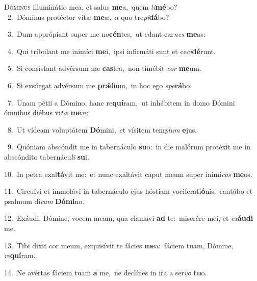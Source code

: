 \lettrine{\initial\textcolor{\initialcolor}{D}}{óminus} illuminátio mea, et salus \textbf{me}\-a,~\star quem \textit{ti}\-\textbf{mé}bo?\\
{\numbfont\textcolor{\numbcolor}{~2.}}~Dóminus protéctor vitæ \textbf{me}\-æ,~\star a quo tre\-\textit{pi}\-\textbf{dá}bo?\par
{\numbfont\textcolor{\numbcolor}{~3.}}~Dum apprópiant super me no\-\textbf{cén}\-tes,~\star ut edant car\textit{nes} \textbf{me}\-as:\par
{\numbfont\textcolor{\numbcolor}{~4.}}~Qui tríbulant me inimíci \textbf{me}\-i,~\star ipsi infirmáti sunt et ce\-\textit{ci}\-\textbf{dé}runt.\par
{\numbfont\textcolor{\numbcolor}{~5.}}~Si consístant advérsum me \textbf{cas}\-tra,~\star non timébit \textit{cor} \textbf{me}\-um.\par
{\numbfont\textcolor{\numbcolor}{~6.}}~Si exsúrgat advérsum me \textbf{prǽ}\-lium,~\star in hoc ego \textit{spe}\-\textbf{rá}bo.\par
{\numbfont\textcolor{\numbcolor}{~7.}}~Unam pétii a Dómino, hanc re\-\textbf{quí}\-ram,~\star ut inhábitem in domo Dómini ómnibus diébus vi\textit{tæ} \textbf{me}\-æ:\par
{\numbfont\textcolor{\numbcolor}{~8.}}~Ut vídeam voluptátem \textbf{Dó}\-mini,~\star et vísitem tem\textit{plum} \textbf{e}\-jus.\par
{\numbfont\textcolor{\numbcolor}{~9.}}~Quóniam abscóndit me in tabernáculo \textbf{su}\-o:~\star in die malórum protéxit me in abscóndito tabernácu\textit{li} \textbf{su}\-i.\par
{\numbfont\textcolor{\numbcolor}{10.}}~In petra exal\-\textbf{tá}\-vit me:~\star et nunc exaltávit caput meum super inimí\textit{cos} \textbf{me}\-os.\par
{\numbfont\textcolor{\numbcolor}{11.}}~Circuívi et immolávi in tabernáculo ejus hóstiam vociferati\-\textbf{ó}\-nis:~\star cantábo et psalmum di\textit{cam} \textbf{Dó}\-\textbf{mi}no.\par
{\numbfont\textcolor{\numbcolor}{12.}}~Exáudi, Dómine, vocem meam, qua clamávi \textbf{ad} te:~\star miserére mei, et \textit{ex}\-\textbf{áu}\textbf{di} me.\par
{\numbfont\textcolor{\numbcolor}{13.}}~Tibi dixit cor meum, exquisívit te fácies \textbf{me}\-a:~\star fáciem tuam, Dómine, \textit{re}\-\textbf{quí}ram.\par
{\numbfont\textcolor{\numbcolor}{14.}}~Ne avértas fáciem tuam \textbf{a} me,~\star ne declínes in ira a ser\textit{vo} \textbf{tu}\-o.\par
